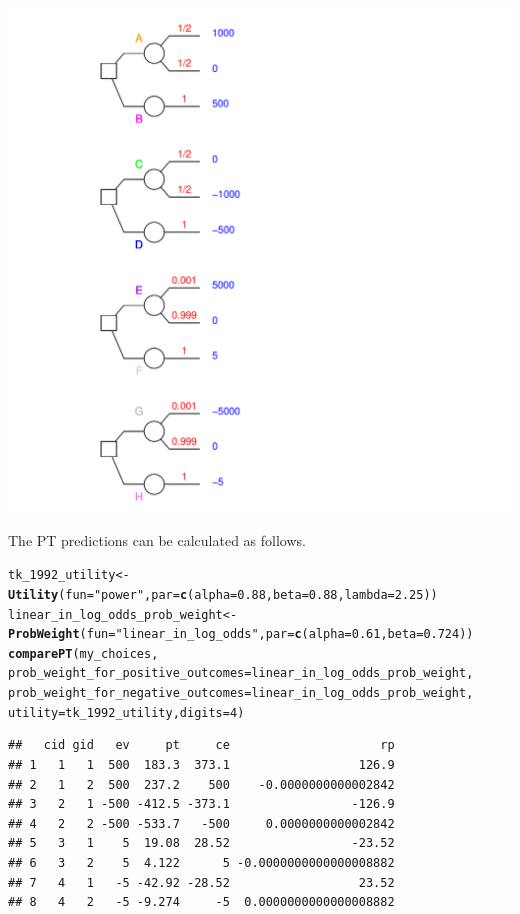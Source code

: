 \documentclass{article}\usepackage[]{graphicx}\usepackage[]{color}
\makeatletter
\newcommand{\hlnum}[1]{\textcolor[rgb]{0.686,0.059,0.569}{#1}}%
\newcommand{\hlstr}[1]{\textcolor[rgb]{0.192,0.494,0.8}{#1}}%
\newcommand{\hlstd}[1]{\textcolor[rgb]{0.345,0.345,0.345}{#1}}%
\newcommand{\hlkwb}[1]{\textcolor[rgb]{0.69,0.353,0.396}{#1}}%
\newcommand{\hlkwc}[1]{\textcolor[rgb]{0.333,0.667,0.333}{#1}}%
\newcommand{\hlkwd}[1]{\textcolor[rgb]{0.737,0.353,0.396}{\textbf{#1}}}%
\newenvironment{kframe}{%
 \def\at@end@of@kframe{}%
 \ifinner\ifhmode%
  \def\at@end@of@kframe{\end{minipage}}%
  \begin{minipage}{\columnwidth}%
 \fi\fi%
 \def\FrameCommand##1{\hskip\@totalleftmargin \hskip-\fboxsep
 \colorbox{shadecolor}{##1}\hskip-\fboxsep
     \hskip-\linewidth \hskip-\@totalleftmargin \hskip\columnwidth}%
 \MakeFramed {\advance\hsize-\width
   \@totalleftmargin\z@ \linewidth\hsize
   \@setminipage}}%
 {\par\unskip\endMakeFramed%
 \at@end@of@kframe}
\newenvironment{knitrout}{}{} %
\makeatother
\begin{document}
\begin{knitrout}
{\centering \includegraphics[width=0.8\linewidth]{figure/unnamed-chunk-32} 

}



\end{knitrout}


The PT predictions can be calculated as follows.

\begin{knitrout}
\color{fgcolor}\begin{kframe}
\begin{alltt}
\hlstd{tk_1992_utility} \hlkwb{<-} \hlkwd{Utility}\hlstd{(}\hlkwc{fun}\hlstd{=}\hlstr{"power"}\hlstd{,} \hlkwc{par}\hlstd{=}\hlkwd{c}\hlstd{(}\hlkwc{alpha}\hlstd{=}\hlnum{0.88}\hlstd{,} \hlkwc{beta}\hlstd{=}\hlnum{0.88}\hlstd{,} \hlkwc{lambda}\hlstd{=}\hlnum{2.25}\hlstd{))}
\hlstd{linear_in_log_odds_prob_weight} \hlkwb{<-} \hlkwd{ProbWeight}\hlstd{(}\hlkwc{fun}\hlstd{=}\hlstr{"linear_in_log_odds"}\hlstd{,} \hlkwc{par}\hlstd{=}\hlkwd{c}\hlstd{(}\hlkwc{alpha}\hlstd{=}\hlnum{0.61}\hlstd{,} \hlkwc{beta}\hlstd{=}\hlnum{0.724}\hlstd{))}
\hlkwd{comparePT}\hlstd{(my_choices,}
        \hlkwc{prob_weight_for_positive_outcomes}\hlstd{=linear_in_log_odds_prob_weight,}
        \hlkwc{prob_weight_for_negative_outcomes}\hlstd{=linear_in_log_odds_prob_weight,}
        \hlkwc{utility}\hlstd{=tk_1992_utility,} \hlkwc{digits}\hlstd{=}\hlnum{4}\hlstd{)}
\end{alltt}
\begin{verbatim}
##   cid gid   ev     pt     ce                     rp
## 1   1   1  500  183.3  373.1                  126.9
## 2   1   2  500  237.2    500    -0.0000000000002842
## 3   2   1 -500 -412.5 -373.1                 -126.9
## 4   2   2 -500 -533.7   -500     0.0000000000002842
## 5   3   1    5  19.08  28.52                 -23.52
## 6   3   2    5  4.122      5 -0.0000000000000008882
## 7   4   1   -5 -42.92 -28.52                  23.52
## 8   4   2   -5 -9.274     -5  0.0000000000000008882
\end{verbatim}
\end{kframe}
\end{knitrout}
\end{document}
